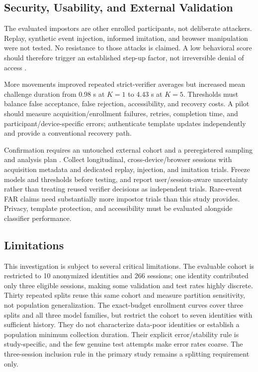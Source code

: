\documentclass[conference]{IEEEtran}
\begin{document}
\subsection{Security, Usability, and External Validation}

The evaluated impostors are other enrolled participants, not deliberate
attackers. Replay, synthetic event injection, informed imitation, and browser
manipulation were not tested. No resistance to those attacks is claimed.
A low behavioral score should therefore trigger an established step-up factor,
not irreversible denial of access \cite{nistBiometrics,deutschmannContinuousAuthentication}.

More movements improved repeated strict-verifier averages but increased mean
challenge duration from 0.98 s at $K=1$ to 4.43 s at $K=5$.
Thresholds must balance false acceptance, false rejection, accessibility, and
recovery costs. A pilot should measure acquisition/enrollment failures, retries,
completion time, and participant/device-specific errors; authenticate template
updates independently and provide a conventional recovery path.

Confirmation requires an untouched external cohort and a preregistered
sampling and analysis plan \cite{isoBiometricTesting}. Collect longitudinal,
cross-device/browser sessions with acquisition metadata and dedicated replay,
injection, and imitation trials. Freeze models and thresholds before testing,
and report user/session-aware uncertainty rather than treating reused verifier
decisions as independent trials. Rare-event FAR claims need substantially more
impostor trials than this study provides. Privacy, template protection, and
accessibility must be evaluated alongside classifier performance.

\subsection{Limitations}
\label{sec:limitations}

This investigation is subject to several critical limitations. The evaluable
cohort is restricted to 10 anonymized identities and 266 sessions; one identity
contributed only three eligible sessions, making some validation and test rates
highly discrete. Thirty repeated splits reuse this same cohort and measure
partition sensitivity, not population generalization. The exact-budget
enrollment curves cover three splits and all three model families, but restrict
the cohort to seven identities with sufficient history. They do not characterize
data-poor identities or establish a population minimum collection duration.
Their explicit error/stability rule is study-specific, and the few genuine
test attempts make error rates coarse. The three-session inclusion rule in
the primary study remains a splitting requirement only.
\end{document}
